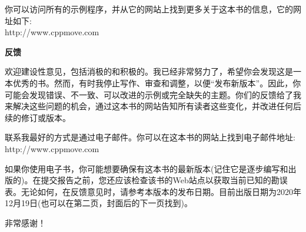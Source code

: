 你可以访问所有的示例程序，并从它的网站上找到更多关于这本书的信息，它的网址如下:\\http://www.cppmove.com\par

\hspace*{\fill} \par %
\textbf{反馈}

欢迎建设性意见，包括消极的和积极的。我已经非常努力了，希望你会发现这是一本优秀的书。然而，有时我停止写作、审查和调整，以便“发布新版本”。因此，你可能会发现错误、不一致、可以改进的示例或完全缺失的主题。你们的反馈给了我来解决这些问题的机会，通过这本书的网站告知所有读者这些变化，并改进任何后续的修订或版本。\par

联系我最好的方式是通过电子邮件。你可以在这本书的网站上找到电子邮件地址:\\http://www.cppmove.com\par

如果你使用电子书，你可能想要确保有这本书的最新版本(记住它是逐步编写和出版的)。在提交报告之前，您还应该检查该书的Web站点以获取当前已知的勘误表。无论如何，在反馈意见时，请参考本版本的发布日期。目前出版日期为2020年12月19日(也可以在第二页，封面后的下一页找到)。\par

非常感谢！\par

\newpage




















